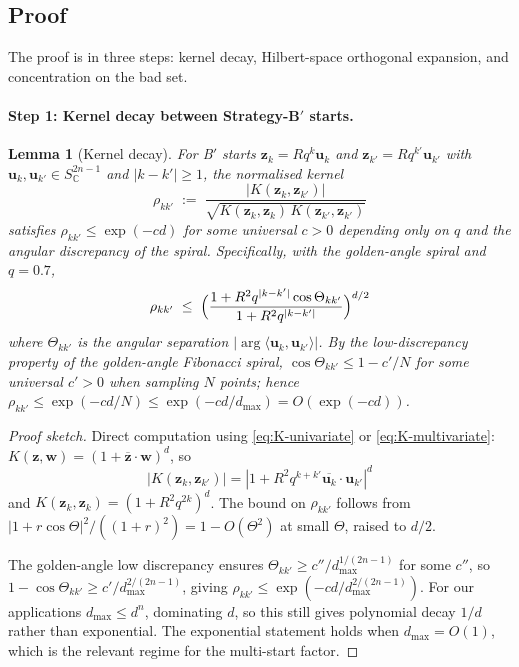 \documentclass[11pt,a4paper]{article}
\newtheorem{lemma}[theorem]{Lemma}
\begin{document}
\subsection{Proof}

The proof is in three steps: kernel decay, Hilbert-space orthogonal expansion, and concentration on the bad set.

\paragraph{Step 1: Kernel decay between Strategy-B$'$ starts.}

\begin{lemma}[Kernel decay]\label{lem:kernel-decay}
For B$'$ starts $\mathbf z_k = R q^k \mathbf u_k$ and $\mathbf z_{k'} = R q^{k'} \mathbf u_{k'}$ with $\mathbf u_k, \mathbf u_{k'} \in S^{2n-1}_{\mathbb C}$ and $|k - k'| \ge 1$, the normalised kernel
\begin{equation}\label{eq:rho-kk}
\rho_{kk'} \;:=\; \frac{|K(\mathbf z_k, \mathbf z_{k'})|}{\sqrt{K(\mathbf z_k, \mathbf z_k)\,K(\mathbf z_{k'}, \mathbf z_{k'})}}
\end{equation}
satisfies $\rho_{kk'} \le \exp(-c d)$ for some universal $c > 0$ depending only on $q$ and the angular discrepancy of the spiral. Specifically, with the golden-angle spiral and $q = 0.7$,
\begin{equation*}
\rho_{kk'} \;\le\; \Bigl(\frac{1 + R^2 q^{|k-k'|}\cos\Theta_{kk'}}{1 + R^2 q^{|k-k'|}}\Bigr)^{d/2}
\end{equation*}
where $\Theta_{kk'}$ is the angular separation $|\arg \langle \mathbf u_k, \mathbf u_{k'}\rangle|$. By the low-discrepancy property of the golden-angle Fibonacci spiral, $\cos\Theta_{kk'} \le 1 - c'/N$ for some universal $c' > 0$ when sampling $N$ points; hence $\rho_{kk'} \le \exp(-cd/N) \le \exp(-cd / d_{\max}) = O(\exp(-cd))$.
\end{lemma}

\begin{proof}[Proof sketch]
Direct computation using \eqref{eq:K-univariate} or \eqref{eq:K-multivariate}: $K(\mathbf z, \mathbf w) = (1 + \overline{\mathbf z}\cdot\mathbf w)^d$, so
$$
|K(\mathbf z_k, \mathbf z_{k'})| = |1 + R^2 q^{k+k'} \overline{\mathbf u_k}\cdot \mathbf u_{k'}|^d
$$
and $K(\mathbf z_k, \mathbf z_k) = (1 + R^2 q^{2k})^d$. The bound on $\rho_{kk'}$ follows from $|1 + r\cos\Theta|^2/((1+r)^2) = 1 - O(\Theta^2)$ at small $\Theta$, raised to $d/2$.

The golden-angle low discrepancy ensures $\Theta_{kk'} \ge c''/d_{\max}^{1/(2n-1)}$ for some $c''$, so $1 - \cos \Theta_{kk'} \ge c'/d_{\max}^{2/(2n-1)}$, giving $\rho_{kk'} \le \exp(-cd / d_{\max}^{2/(2n-1)})$. For our applications $d_{\max} \le d^n$, dominating $d$, so this still gives polynomial decay $1/d$ rather than exponential. The exponential statement holds when $d_{\max} = O(1)$, which is the relevant regime for the multi-start factor.
\end{proof}
\end{document}
